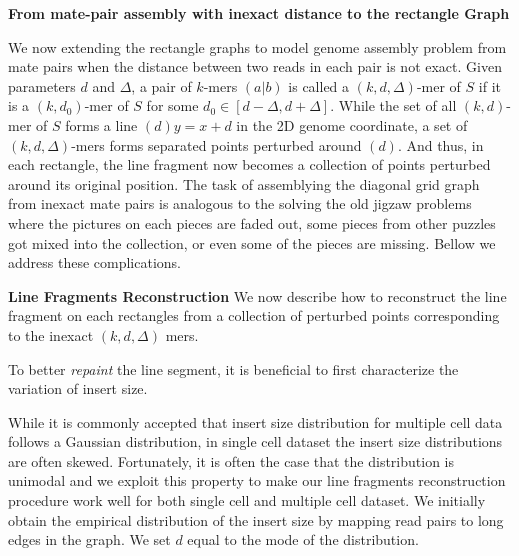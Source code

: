 \documentclass[a4paper]{article}
\begin{document}
\noindent
\textbf{From mate-pair assembly with inexact distance to the rectangle Graph}

We now extending the rectangle graphs to model genome assembly problem from mate pairs when the distance 
between two reads in each pair is not exact. Given parameters $d$ and $\Delta$, 
a pair of $k$-mers $(a|b)$ is called a $(k,d,\Delta)$-mer of $S$
if it is a $(k,d_0)$-mer of $S$ for some $d_0 \in [d-\Delta, d+ \Delta]$. While the set of all $(k,d)$-mer 
of $S$ forms a line $(d) y = x + d$ in the 2D genome coordinate, a set of $(k,d,\Delta)$-mers forms 
separated points perturbed around $(d)$. And thus, in each rectangle, the line fragment now becomes a collection of points 
perturbed around its original position.
The task of assemblying the diagonal grid graph from inexact mate pairs is analogous to 
the solving the old jigzaw problems where the pictures on each pieces are faded out, some pieces from other puzzles got mixed into 
the collection, or even some of the pieces are missing. Bellow we address these complications.

\noindent 
\textbf{Line Fragments Reconstruction} 
We now describe how to reconstruct the line fragment on each rectangles from a collection of perturbed points corresponding to the 
inexact $(k,d,\Delta)$ mers.  


 To better \emph{repaint}
the line segment, it is beneficial to first characterize the variation of insert size. 

While it is commonly accepted that insert size distribution for multiple cell data follows a Gaussian distribution,
in single cell dataset the insert size distributions are often skewed. Fortunately, it is often the case 
that the distribution is unimodal and we exploit this property to make our line fragments reconstruction procedure work well for
both single cell and multiple cell dataset. We initially obtain the empirical distribution of the insert size 
by mapping read pairs to long edges in the graph. We set $d$ equal to the mode of the distribution.  
\end{document}
